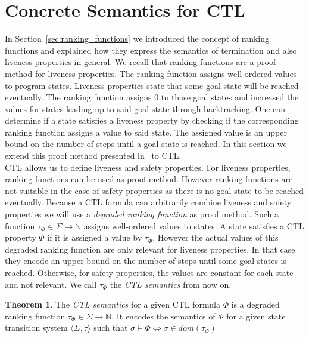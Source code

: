 \documentclass[11pt,a4paper,titlepage]{article}
\theoremstyle{definition}
\newtheorem{theorem}{Theorem}[section]
\begin{document}
\section{Concrete Semantics for CTL}\label{sec:ctl_semantics}

In Section~\ref{sec:ranking_functions} we introduced the concept of ranking functions and explained how they express the semantics of 
termination and also liveness properties in general. We recall that ranking functions are a proof method for liveness properties. 
The ranking function assigns well-ordered values to program states. 
Liveness properties state that some goal state will be reached eventually. The ranking function assigns $0$ to those goal states 
and increased the values for states leading up to said goal state through backtracking.
One can determine if a state satisfies a liveness property by checking if the corresponding ranking function
assigns a value to said state. The assigned value is an upper bound on the number of steps until a goal state is reached.
In this section we extend this proof method presented in~\cite{UrbanPhd} to CTL.\\

CTL allows us to define liveness and safety properties. For liveness properties, ranking functions can be used as proof method. 
However ranking functions are not suitable in the case of safety properties as there is no goal state to be reached eventually. 
Because a CTL formula can arbitrarily combine liveness and safety properties we will use a \textit{degraded ranking function} as proof method. 
Such a function $\tau_\Phi \in \Sigma \rightarrow \mathbb{N}$ assigns well-ordered values to states. 
A state satisfies a CTL property $\Phi$ if it is assigned a value by $\tau_\Phi$. 
However the actual values of this degraded ranking function are only relevant for liveness properties. In that case they encode 
an upper bound on the number of steps until some goal states is reached. 
Otherwise, for safety properties, the values are constant for each state and not relevant. 
We call $\tau_\Phi$ the \textit{CTL semantics} from now on.

\begin{theorem}\label{thr:ctl_semantics}
    The \textit{CTL semantics} for a given CTL formula $\Phi$ is a degraded ranking function 
    $\tau_{\Phi} \in \Sigma \rightarrow \mathbb{N}$. 
    It encodes the semantics of $\Phi$ for a given state transition 
    system $\langle \Sigma, \tau \rangle$ such that 
    $\sigma \models \Phi \iff \sigma \in dom(\tau_{\Phi})$
\end{theorem}
\end{document}

